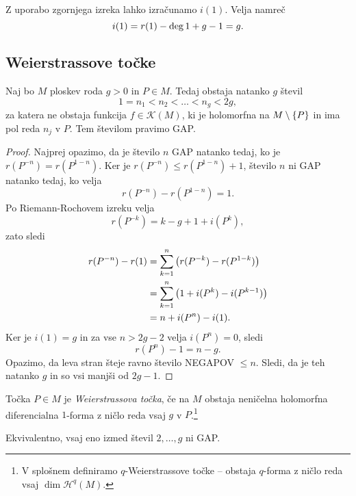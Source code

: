 \begin{zgled}
Z uporabo zgornjega izreka lahko izračunamo $i(1)$. Velja namreč
\[
i(1) = r(1) - \deg 1 + g - 1 = g. \qedhere
\]
\end{zgled}


\subsection{Weierstrassove točke}

\begin{izrek}[Weierstrass]
Naj bo $M$ ploskev roda $g > 0$ in $P \in M$. Tedaj obstaja
natanko $g$ števil
\[
1 = n_1 < n_2 < \dots < n_g < 2g,
\]
za katera ne obstaja funkcija $f \in \mathscr{K}(M)$, ki je
holomorfna na $M \setminus \left\{P\right\}$ in ima pol reda $n_j$ v $P$.
Tem številom pravimo GAP.
\end{izrek}

\begin{proof}
Najprej opazimo, da je število $n$ GAP natanko tedaj, ko je
$r(P^{-n}) = r(P^{1-n})$. Ker je $r(P^{-n}) \leq r(P^{1-n}) + 1$,
število $n$ ni GAP natanko tedaj, ko velja
\[
r(P^{-n}) - r(P^{1-n}) = 1.
\]
Po Riemann-Rochovem izreku velja
\[
r(P^{-k}) = k-g+1 + i(P^k),
\]
zato sledi
\begin{align*}
r(P^{-n}) - r(1) &= \sum_{k=1}^n \left(r(P^{-k}) - r(P^{1-k})\right)
\\
&=
\sum_{k=1}^n \left(1 + i(P^k) - i(P^{k-1})\right)
\\
&=
n + i(P^n) - i(1).
\end{align*}
Ker je $i(1) = g$ in za vse $n > 2g-2$ velja $i(P^n) = 0$, sledi
\[
r(P^n) - 1 = n - g.
\]
Opazimo, da leva stran šteje ravno število NEGAPOV $\leq n$.
Sledi, da je teh natanko $g$ in so vsi manjši od $2g-1$.
\end{proof}


\begin{definicija}
Točka $P \in M$ je \emph{Weierstrassova točka}, če na $M$ obstaja
neničelna holomorfna diferencialna $1$-forma z ničlo reda vsaj
$g$ v $P$.\footnote{V splošnem definiramo $q$-Weierstrassove točke
-- obstaja $q$-forma z ničlo reda vsaj $\dim \mathscr{H}^q(M)$.}
\end{definicija}

\begin{lema}
Ekvivalentno, vsaj eno izmed števil $2, \dots, g$ ni GAP.
\end{lema}

